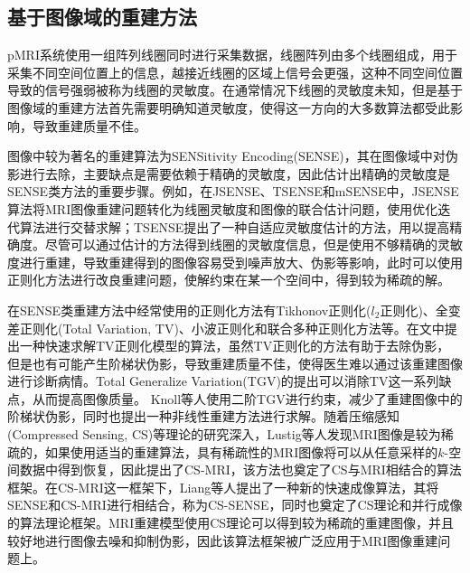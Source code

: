 \documentclass[UTF8]{article}
\begin{document}
\subsection{基于图像域的重建方法}
\par pMRI系统使用一组阵列线圈同时进行采集数据，线圈阵列由多个线圈组成，用于采集不同空间位置上的信息，越接近线圈的区域上信号会更强，这种不同空间位置导致的信号强弱被称为线圈的灵敏度。在通常情况下线圈的灵敏度未知，但是基于图像域的重建方法首先需要明确知道灵敏度，使得这一方向的大多数算法都受此影响，导致重建质量不佳。
\par 图像中较为著名的重建算法为SENSitivity Encoding(SENSE)\cite{pruessmann1999sense}，其在图像域中对伪影进行去除，主要缺点是需要依赖于精确的灵敏度，因此估计出精确的灵敏度是SENSE类方法的重要步骤。例如，在JSENSE\cite{ying2007joint}、TSENSE\cite{kellman2001adaptive}和mSENSE\cite{kreitner2006fast}中，JSENSE算法将MRI图像重建问题转化为线圈灵敏度和图像的联合估计问题，使用优化迭代算法进行交替求解；TSENSE提出了一种自适应灵敏度估计的方法，用以提高精确度。尽管可以通过估计的方法得到线圈的灵敏度信息，但是使用不够精确的灵敏度进行重建，导致重建得到的图像容易受到噪声放大、伪影等影响，此时可以使用正则化方法进行改良重建问题，使解约束在某一个空间中，得到较为稀疏的解。
\par 在SENSE类重建方法中经常使用的正则化方法有Tikhonov正则化($l_2$正则化)、全变差正则化(Total Variation, TV)、小波正则化和联合多种正则化方法等。在文\cite{ye2010computational}中提出一种快速求解TV正则化模型的算法，虽然TV正则化的方法有助于去除伪影， 但是也有可能产生阶梯状伪影，导致重建质量不佳，使得医生难以通过该重建图像进行诊断病情。Total Generalize Variation(TGV)\cite{bredies2010total}的提出可以消除TV这一系列缺点，从而提高图像质量。 Knoll等人\cite{knoll2012parallel}使用二阶TGV进行约束，减少了重建图像中的阶梯状伪影，同时也提出一种非线性重建方法进行求解。随着压缩感知(Compressed Sensing, CS)等理论的研究深入，Lustig等人发现MRI图像是较为稀疏的，如果使用适当的重建算法，具有稀疏性的MRI图像将可以从任意采样的$k$-空间数据中得到恢复，因此提出了CS-MRI\cite{lustig2007sparse}，该方法也奠定了CS与MRI相结合的算法框架。在CS-MRI这一框架下，Liang等人提出了一种新的快速成像算法，其将SENSE和CS-MRI进行相结合，称为CS-SENSE\cite{liang2009accelerating}，同时也奠定了CS理论和并行成像的算法理论框架。MRI重建模型使用CS理论可以得到较为稀疏的重建图像，并且较好地进行图像去噪和抑制伪影，因此该算法框架被广泛应用于MRI图像重建问题上。
\end{document}
